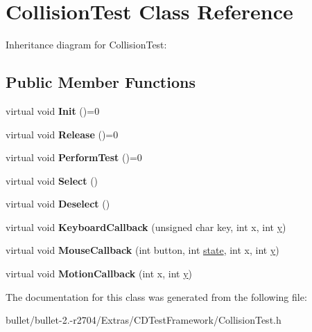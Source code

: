 \hypertarget{class_collision_test}{\section{Collision\+Test Class Reference}
\label{class_collision_test}
}


Inheritance diagram for Collision\+Test\+:
\subsection*{Public Member Functions}
\begin{DoxyCompactItemize}
\item 
\hypertarget{class_collision_test_abd311073d2e44122bccf2d7185e5b138}{virtual void {\bfseries Init} ()=0}\label{class_collision_test_abd311073d2e44122bccf2d7185e5b138}

\item 
\hypertarget{class_collision_test_a42040ad50e1fe41a01709145df4cb343}{virtual void {\bfseries Release} ()=0}\label{class_collision_test_a42040ad50e1fe41a01709145df4cb343}

\item 
\hypertarget{class_collision_test_a1279cc72492acaf4a2a8105c31461e2e}{virtual void {\bfseries Perform\+Test} ()=0}\label{class_collision_test_a1279cc72492acaf4a2a8105c31461e2e}

\item 
\hypertarget{class_collision_test_ae30fb4a10273e2a19a1e9c9579770d91}{virtual void {\bfseries Select} ()}\label{class_collision_test_ae30fb4a10273e2a19a1e9c9579770d91}

\item 
\hypertarget{class_collision_test_aad3bd99e79fb0a68f8cc927b49510348}{virtual void {\bfseries Deselect} ()}\label{class_collision_test_aad3bd99e79fb0a68f8cc927b49510348}

\item 
\hypertarget{class_collision_test_a164f67143088795c7933709b1400f32a}{virtual void {\bfseries Keyboard\+Callback} (unsigned char key, int x, int \hyperlink{_ice_utils_8h_aa7ffaed69623192258fb8679569ff9ba}{y})}\label{class_collision_test_a164f67143088795c7933709b1400f32a}

\item 
\hypertarget{class_collision_test_a12d38971ab9a6bcf841abd164d6e0c5d}{virtual void {\bfseries Mouse\+Callback} (int button, int \hyperlink{structstate}{state}, int x, int \hyperlink{_ice_utils_8h_aa7ffaed69623192258fb8679569ff9ba}{y})}\label{class_collision_test_a12d38971ab9a6bcf841abd164d6e0c5d}

\item 
\hypertarget{class_collision_test_a349289fb90eb55684810f03fe9339570}{virtual void {\bfseries Motion\+Callback} (int x, int \hyperlink{_ice_utils_8h_aa7ffaed69623192258fb8679569ff9ba}{y})}\label{class_collision_test_a349289fb90eb55684810f03fe9339570}

\end{DoxyCompactItemize}


The documentation for this class was generated from the following file\+:\begin{DoxyCompactItemize}
\item 
bullet/bullet-\/2.-\/r2704/\+Extras/\+C\+D\+Test\+Framework/Collision\+Test.\+h\end{DoxyCompactItemize}

